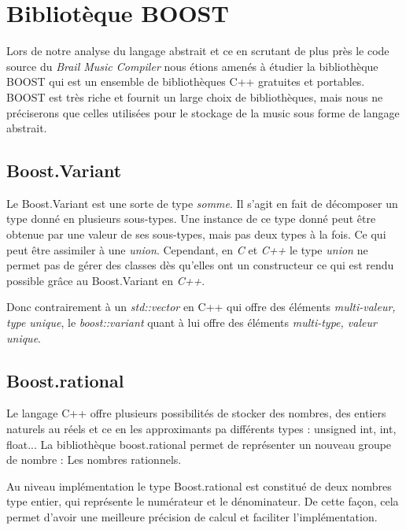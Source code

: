 \section{Bibliotèque BOOST}

Lors de notre analyse du langage abstrait et ce en scrutant de plus près le code source du \textit{Brail Music Compiler} nous étions amenés à étudier la bibliothèque BOOST  qui est un ensemble de bibliothèques C++ gratuites et portables. BOOST est très riche et fournit un large choix de bibliothèques, mais nous ne préciserons que celles utilisées pour le stockage de la music sous forme de langage abstrait.


\subsection*{Boost.Variant}

Le Boost.Variant est une sorte de type \textit{somme}. Il s'agit en fait de décomposer un type donné en plusieurs sous-types. Une instance de ce type donné peut être obtenue par une valeur de ses sous-types, mais pas deux types à la fois. Ce qui peut être assimiler à une \textit{union}. Cependant, en \textit{C} et \textit{C++} le type \textit{union} ne permet pas de gérer des classes dès qu'elles ont un constructeur ce qui est rendu possible grâce au Boost.Variant en \textit{C++}.

Donc contrairement à un \textit{std::vector} en C++ qui offre des éléments \textit{multi-valeur, type unique}, le \textit{boost::variant} quant à lui offre des éléments \textit{multi-type, valeur unique}.


\subsection*{Boost.rational}

Le langage C++ offre plusieurs possibilités de stocker des nombres, des entiers naturels au réels et ce en les approximants pa différents types : unsigned int, int, float... La bibliothèque boost.rational permet de représenter un nouveau groupe de nombre : Les nombres rationnels.

Au niveau implémentation le type Boost.rational est constitué de deux nombres type entier, qui représente le numérateur et le dénominateur. De cette façon, cela permet d'avoir une meilleure précision de calcul et faciliter l'implémentation.



